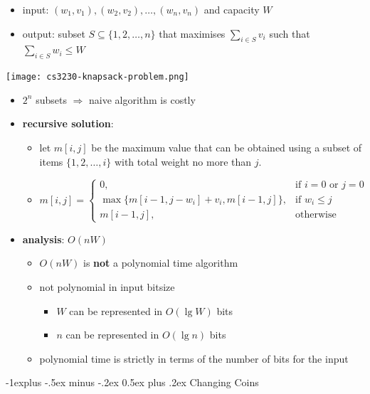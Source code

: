 \documentclass[10pt, landscape]{article}
\makeatletter
\renewcommand{\subsection}{\@startsection{subsection}{2}{0mm}%
  {-1explus -.5ex minus -.2ex}%
  {0.5ex plus .2ex}%
{\normalfont\normalsize\bfseries}}
\makeatother
\begin{document}
\begin{multicols*}{4}
  \begin{itemize}
    \item input: $(w_1, v_1), (w_2, v_2), \dots, (w_n, v_n) $ and capacity $W$
    \item output: subset $S \subseteq \{ 1, 2, \dots, n \}$ that maximises $\sum_{i \in S}v_i$ such that $\sum_{i \in S} w_i \leq W$
  \end{itemize}

  \begin{tightcenter}
    \texttt{[image: cs3230-knapsack-problem.png]} 
  \end{tightcenter}

  \begin{itemize}
    \item $2^n$ subsets $\Rightarrow$ naive algorithm is costly 
    \item \textbf{recursive solution}:
      \begin{itemize}
        \item let $m[i, j]$ be the maximum value that can be obtained using a subset of items $\{1, 2, \dots, i\}$ 
          with total weight no more than $j$.
        \item $m[i, j] = \begin{cases} 0, & \text{if $i=0$ or $j=0$} \\ \max\{ {\scriptstyle m[i-1, j-w_i] + v_i, m[i-1, j] }\}, & \text{if $w_i \leq j$} \\ m[i-1, j], & \text{otherwise} \end{cases} $
      \end{itemize}
    \item \textbf{analysis}: $O(nW)$
      \begin{itemize}
        \item \attention $O(nW)$ is \textbf{not} a polynomial time algorithm
        \item not polynomial in input bitsize 
          \begin{itemize}
            \item $W$ can be represented in $O(\lg W)$ bits
            \item $n$ can be represented in $O(\lg n)$ bits
          \end{itemize}
        \item polynomial time is strictly in terms of the number of bits for the input
      \end{itemize}
  \end{itemize}

  \subsection{Changing Coins}


\end{multicols*}
\end{document}
